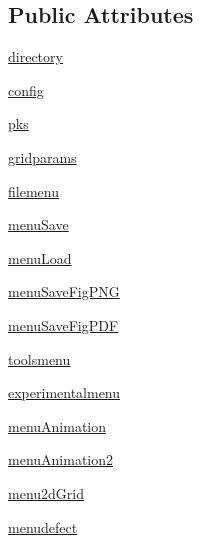 \subsection*{Public Attributes}
\begin{DoxyCompactItemize}
\item 
\hyperlink{class_uni_dec_1_1datacollector_1_1_data_collector_a3e55d1f4bc6a0f45a105226c280f77b8}{directory}
\item 
\hyperlink{class_uni_dec_1_1datacollector_1_1_data_collector_a1a12326c0ea9260b0f8085d3a9219717}{config}
\item 
\hyperlink{class_uni_dec_1_1datacollector_1_1_data_collector_a83efe336d14f25ae05b8732cd6a1438a}{pks}
\item 
\hyperlink{class_uni_dec_1_1datacollector_1_1_data_collector_abd68d9eb342c6ae7e65a30756af6b0b2}{gridparams}
\item 
\hyperlink{class_uni_dec_1_1datacollector_1_1_data_collector_a7fbb3951cc7670cf22db3eada923b54b}{filemenu}
\item 
\hyperlink{class_uni_dec_1_1datacollector_1_1_data_collector_a683f69e2366afbb5355e2135aa291206}{menu\+Save}
\item 
\hyperlink{class_uni_dec_1_1datacollector_1_1_data_collector_a64b6c021b8a18c410bd7a7272d25c5a1}{menu\+Load}
\item 
\hyperlink{class_uni_dec_1_1datacollector_1_1_data_collector_a32f2e146d736ae9aee59fcd708c4fd1e}{menu\+Save\+Fig\+P\+N\+G}
\item 
\hyperlink{class_uni_dec_1_1datacollector_1_1_data_collector_ab67670840e41f888285a8a7bb55fe036}{menu\+Save\+Fig\+P\+D\+F}
\item 
\hyperlink{class_uni_dec_1_1datacollector_1_1_data_collector_a3bd75e979db857c669341096501c588e}{toolsmenu}
\item 
\hyperlink{class_uni_dec_1_1datacollector_1_1_data_collector_a0f9374a128c1806733cc3c739133e09f}{experimentalmenu}
\item 
\hyperlink{class_uni_dec_1_1datacollector_1_1_data_collector_ac5b513edceafeb972f2cc08dba1f0a95}{menu\+Animation}
\item 
\hyperlink{class_uni_dec_1_1datacollector_1_1_data_collector_ae262901525996d89ea64e642a05f9e82}{menu\+Animation2}
\item 
\hyperlink{class_uni_dec_1_1datacollector_1_1_data_collector_a96514321c97b05ce0e3c87da1ee8284e}{menu2d\+Grid}
\item 
\hyperlink{class_uni_dec_1_1datacollector_1_1_data_collector_a73197d36711244d2e453faaafd3a3e4c}{menudefect}

\end{DoxyCompactItemize}
